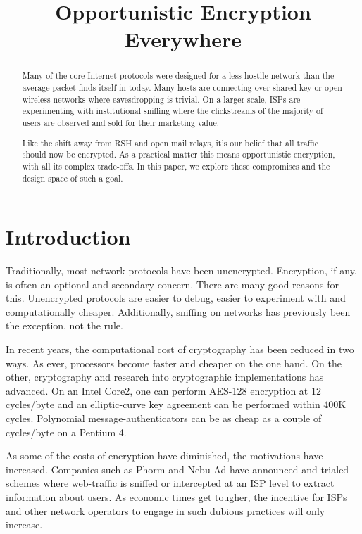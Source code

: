 \documentclass[conference]{IEEEtran}
\begin{document}
\title{Opportunistic Encryption Everywhere}

\author{
}

\maketitle

\begin{abstract}
Many of the core Internet protocols were designed for a less hostile network
than the average packet finds itself in today. Many hosts are connecting over
shared-key or open wireless networks where eavesdropping is trivial. On a larger
scale, ISPs are experimenting with institutional sniffing where the
clickstreams of the majority of users are observed and sold for their marketing
value.

Like the shift away from RSH and open mail relays, it's our belief that all
traffic should now be encrypted. As a practical matter this means
opportunistic encryption, with all its complex trade-offs. In this paper, we
explore these compromises and the design space of such a goal.
\end{abstract}

\section{Introduction}

Traditionally, most network protocols have been unencrypted. Encryption, if
any, is often an optional and secondary concern. There are many good reasons
for this. Unencrypted protocols are easier to debug, easier to experiment with
and computationally cheaper. Additionally, sniffing on networks has previously
been the exception, not the rule.

In recent years, the computational cost of cryptography has been reduced in two
ways.  As ever, processors become faster and cheaper on the one hand. On the
other, cryptography and research into cryptographic implementations has
advanced. On an Intel Core2, one can perform AES-128 encryption at 12
cycles/byte\cite{aesspeed} and an elliptic-curve key agreement can be performed
within 400K cycles\cite{curve25519}. Polynomial message-authenticators can be as
cheap as a couple of cycles/byte on a Pentium 4\cite{umac}.

As some of the costs of encryption have diminished, the motivations have
increased. Companies such as Phorm and Nebu-Ad have announced and trialed
schemes where web-traffic is sniffed or intercepted at an ISP level to extract
information about users.  As economic times get tougher, the incentive for ISPs
and other network operators to engage in such dubious practices will only
increase.
\end{document}
